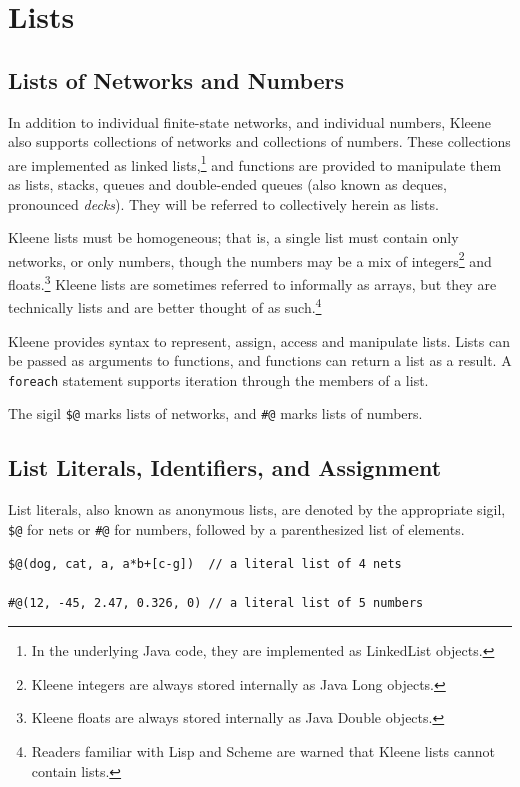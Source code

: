 \documentclass[letterpaper,12pt]{article}
\begin{document}
\section{Lists}


\subsection{Lists of Networks and Numbers}

In addition to individual finite-state networks, and individual numbers,
Kleene also supports collections of networks and collections of numbers.
These collections are implemented as linked lists,\footnote{In the
underlying Java code, they are implemented as LinkedList objects.} and
functions are provided to manipulate them as lists, stacks, queues and
double-ended queues (also known as deques, pronounced \emph{decks}).
They will be referred to collectively herein as lists.

Kleene lists must be homogeneous; that is, a single list must contain
only networks, or only numbers, though the numbers may be a mix of
integers\footnote{Kleene integers are always stored internally as Java
Long objects.} and floats.\footnote{Kleene floats are always stored
internally as Java Double objects.}  Kleene lists are sometimes referred
to informally as arrays, but they are technically lists and are better
thought of as such.\footnote{Readers familiar with Lisp and Scheme are
warned that Kleene lists cannot contain lists.}

Kleene provides syntax to represent, assign, access and manipulate lists.
Lists can be passed as arguments to functions, and functions can
return a list as a result.  A \texttt{foreach} statement supports
iteration through the members of a list.

The sigil \verb!$@! marks lists of networks, and \verb!#@! marks lists of
numbers. 

\subsection{List Literals, Identifiers, and Assignment}

List literals, also known as anonymous lists, are denoted by the
appropriate sigil, \verb!$@! for nets or \verb!#@! for numbers, followed
by a parenthesized list of elements.

\begin{Verbatim}[fontsize=\small]
$@(dog, cat, a, a*b+[c-g])  // a literal list of 4 nets

#@(12, -45, 2.47, 0.326, 0) // a literal list of 5 numbers
\end{Verbatim}
\end{document}
